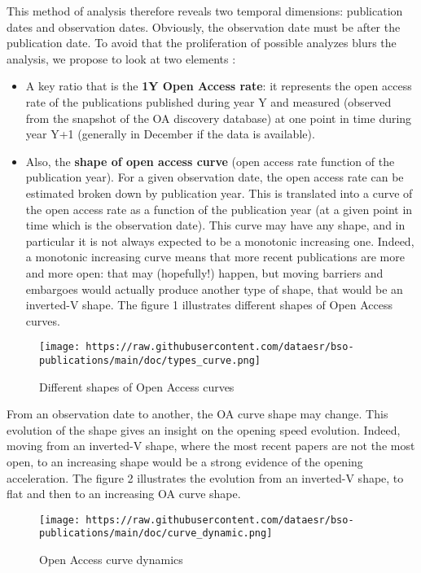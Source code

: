 \documentclass[
]{article}
\begin{document}
This method of analysis therefore reveals two temporal dimensions:
publication dates and observation dates. Obviously, the observation date
must be after the publication date. To avoid that the proliferation of
possible analyzes blurs the analysis, we propose to look at two elements
:

\begin{itemize}
\item
  A key ratio that is the \textbf{1Y Open Access rate}: it represents
  the open access rate of the publications published during year Y and
  measured (observed from the snapshot of the OA discovery database) at
  one point in time during year Y+1 (generally in December if the data
  is available).
\item
  Also, the \textbf{shape of open access curve} (open access rate
  function of the publication year). For a given observation date, the
  open access rate can be estimated broken down by publication year.
  This is translated into a curve of the open access rate as a function
  of the publication year (at a given point in time which is the
  observation date). This curve may have any shape, and in particular it
  is not always expected to be a monotonic increasing one. Indeed, a
  monotonic increasing curve means that more recent publications are
  more and more open: that may (hopefully!) happen, but moving barriers
  and embargoes would actually produce another type of shape, that would
  be an inverted-V shape. The figure 1 illustrates different shapes of
  Open Access curves.
\end{itemize}

\begin{figure}
\centering
\texttt{[image: https://raw.githubusercontent.com/dataesr/bso-publications/main/doc/types\_curve.png]}
\caption{Different shapes of Open Access curves}
\end{figure}

From an observation date to another, the OA curve shape may change. This
evolution of the shape gives an insight on the opening speed evolution.
Indeed, moving from an inverted-V shape, where the most recent papers
are not the most open, to an increasing shape would be a strong evidence
of the opening acceleration. The figure 2 illustrates the evolution from
an inverted-V shape, to flat and then to an increasing OA curve shape.

\begin{figure}
\centering
\texttt{[image: https://raw.githubusercontent.com/dataesr/bso-publications/main/doc/curve\_dynamic.png]}
\caption{Open Access curve dynamics}
\end{figure}
\end{document}

